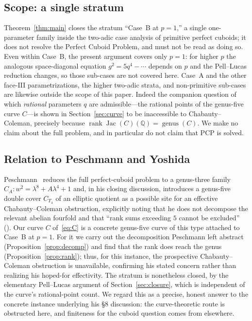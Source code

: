 \documentclass[11pt,reqno]{amsart}
\theoremstyle{plain}
\theoremstyle{definition}
\newcommand{\Q}{\mathbb{Q}}
\DeclareMathOperator{\Jac}{Jac}
\DeclareMathOperator{\rank}{rank}
\begin{document}
\subsection{Scope: a single stratum}\label{sec:scopelimit}

Theorem~\ref{thm:main} closes the stratum ``Case~B at $p=1$,'' a single
one-parameter family inside the two-adic case analysis of primitive perfect
cuboids; it does not resolve the Perfect Cuboid Problem, and must not be read as
doing so. Even within Case~B, the present argument covers only $p=1$: for higher
$p$ the analogous space-diagonal equation $g^2=5q^4-\cdots$ depends on $p$ and
the Pell--Lucas reduction changes, so those sub-cases are not covered here.
Case~A and the other face-III parametrizations, the higher two-adic strata, and
non-primitive sub-cases are likewise outside the scope of this paper. Indeed the
companion question of which \emph{rational} parameters $q$ are admissible---the
rational points of the genus-five curve $C$---is shown in
Section~\ref{sec:curve} to be inaccessible to Chabauty--Coleman, precisely
because $\rank\Jac(C)(\Q)=\operatorname{genus}(C)$. We make no claim about the
full problem, and in particular do not claim that PCP is solved.

\subsection{Relation to Peschmann and Yoshida}\label{sec:related}

Peschmann~\cite{peschmann} reduces the full perfect-cuboid problem to a
genus-three family $C_A:w^2=\lambda^8+A\lambda^4+1$ and, in his closing
discussion, introduces a genus-five double cover $C_{T_4}$ of an elliptic
quotient as a possible site for an effective Chabauty--Coleman obstruction,
explicitly noting that he does not decompose the relevant abelian fourfold and
that ``rank sums exceeding $5$ cannot be excluded'' (\cite[\S8]{peschmann}). Our
curve $C$ of~\eqref{eq:C} is a concrete genus-five curve of this type attached to
Case~B at $p=1$. For it we carry out the decomposition Peschmann left abstract
(Proposition~\ref{prop:decomp}) and find that the rank does reach the genus
(Proposition~\ref{prop:rank}); thus, for this instance, the prospective
Chabauty--Coleman obstruction is unavailable, confirming his stated concern
rather than realizing his hoped-for effectivity. The stratum is nonetheless
closed, by the elementary Pell--Lucas argument of Section~\ref{sec:closure},
which is independent of the curve's rational-point count. We regard this as a
precise, honest answer to the concrete instance underlying his \S8 discussion:
the curve-theoretic route is obstructed here, and finiteness for the cuboid
question comes from elsewhere.
\end{document}
